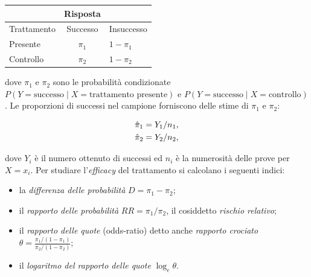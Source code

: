 \documentclass[
  11pt,
]{krantz}
\providecommand{\tightlist}{%
  \setlength{\itemsep}{0pt}\setlength{\parskip}{0pt}}
\theoremstyle{definition}
\theoremstyle{definition}
\theoremstyle{definition}
\theoremstyle{definition}
\theoremstyle{remark}
\begin{document}
\begin{longtable}[]{@{}lcl@{}}
\toprule
& Risposta & \\
\midrule
\endhead
Trattamento & Successo & Insuccesso \\
Presente & \(\pi_1\) & \(1-\pi_1\) \\
Controllo & \(\pi_2\) & \(1-\pi_2\) \\
\bottomrule
\end{longtable}

dove \(\pi_1\) e \(\pi_2\) sono le probabilità condizionate \(P(Y = \text{successo} \mid X=\text{trattamento presente})\) e \(P(Y = \text{successo} \mid X=\text{controllo})\). Le proporzioni di successi nel campione forniscono delle stime di \(\pi_1\) e \(\pi_2\):

\begin{equation}
\begin{aligned}
\hat{\pi}_1 &= Y_1/n_1,\notag\\
\hat{\pi}_2 & = Y_2/n_2,\notag\end{aligned}
\end{equation}

dove \(Y_i\) è il numero ottenuto di successi ed \(n_i\) è la numerosità delle prove per \(X = x_i\). Per studiare l'\emph{efficacy} del trattamento si calcolano i seguenti indici:

\begin{itemize}
\tightlist
\item
  la \emph{differenza delle probabilità} \(D=\pi_{1} -  \pi_{2}\);
\item
  il \emph{rapporto delle probabilità} \(RR=\pi_{1} / \pi_{2}\), il cosiddetto \emph{rischio relativo};
\item
  il \emph{rapporto delle quote} (odds-ratio) detto anche \emph{rapporto crociato} \(\theta = \frac{\pi_1/(1-\pi_1)}{\pi_2/ (1-\pi_2)}\);
\item
  il \emph{logaritmo del rapporto delle quote} \(\log_e \theta\).
\end{itemize}
\end{document}
